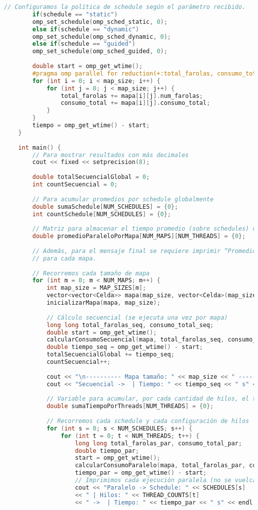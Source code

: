 \documentclass{article}
\begin{document}
\begin{lstlisting}[language=C++, style=cpp-style, caption={Ejemplo de código en C++.}]
		// Configuramos la política de schedule según el parámetro recibido.
		if(schedule == "static")
		omp_set_schedule(omp_sched_static, 0);
		else if(schedule == "dynamic")
		omp_set_schedule(omp_sched_dynamic, 0);
		else if(schedule == "guided")
		omp_set_schedule(omp_sched_guided, 0);
		
		double start = omp_get_wtime();
		#pragma omp parallel for reduction(+:total_farolas, consumo_total) schedule(runtime)
		for (int i = 0; i < map_size; i++) {
			for (int j = 0; j < map_size; j++) {
				total_farolas += mapa[i][j].num_farolas;
				consumo_total += mapa[i][j].consumo_total;
			}
		}
		tiempo = omp_get_wtime() - start;
	}
	
	int main() {
		// Para mostrar resultados con más decimales
		cout << fixed << setprecision(8);
		
		double totalSecuencialGlobal = 0;
		int countSecuencial = 0;
		
		// Para acumular promedios por schedule globalmente
		double sumaSchedule[NUM_SCHEDULES] = {0};
		int countSchedule[NUM_SCHEDULES] = {0};
		
		// Matriz para almacenar el tiempo promedio (sobre schedules) de cada mapa y configuración de hilos.
		double promedioParaleloPorMapa[NUM_MAPS][NUM_THREADS] = {0};
		
		// Además, para el mensaje final se requiere imprimir “Promedio Paralelo con X hilos MxM”
		// para cada mapa.
		
		// Recorremos cada tamaño de mapa
		for (int m = 0; m < NUM_MAPS; m++) {
			int map_size = MAP_SIZES[m];
			vector<vector<Celda>> mapa(map_size, vector<Celda>(map_size, {0,0}));
			inicializarMapa(mapa, map_size);
			
			// Cálculo secuencial (se ejecuta una vez por mapa)
			long long total_farolas_seq, consumo_total_seq;
			double start = omp_get_wtime();
			calcularConsumoSecuencial(mapa, total_farolas_seq, consumo_total_seq, map_size);
			double tiempo_seq = omp_get_wtime() - start;
			totalSecuencialGlobal += tiempo_seq;
			countSecuencial++;
			
			cout << "\n---------- Mapa tamaño: " << map_size << " ----------\n";
			cout << "Secuencial ->  | Tiempo: " << tiempo_seq << " s" << endl;
			
			// Variable para acumular, por cada cantidad de hilos, el tiempo (sobre los 3 schedules)
			double sumaTiempoPorThreads[NUM_THREADS] = {0};
			
			// Recorremos cada schedule y cada configuración de hilos
			for (int s = 0; s < NUM_SCHEDULES; s++) {
				for (int t = 0; t < NUM_THREADS; t++) {
					long long total_farolas_par, consumo_total_par;
					double tiempo_par;
					start = omp_get_wtime();
					calcularConsumoParalelo(mapa, total_farolas_par, consumo_total_par, map_size, THREAD_COUNTS[t], SCHEDULES[s], tiempo_par);
					tiempo_par = omp_get_wtime() - start;
					// Imprimimos cada ejecución paralela (no se vuelcan los totales en cada línea)
					cout << "Paralelo -> Schedule: " << SCHEDULES[s]
					<< " | Hilos: " << THREAD_COUNTS[t]
					<< " ->  | Tiempo: " << tiempo_par << " s" << endl;
					

\end{lstlisting}
\end{document}

